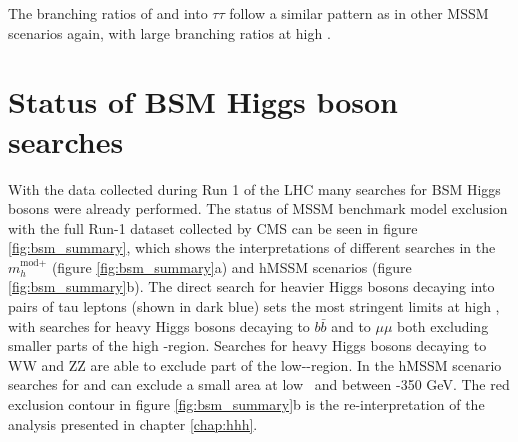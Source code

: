 The branching ratios of \PHiggs and \PHiggsps into $\tau\tau$ follow a similar
pattern as in other MSSM scenarios again, with large branching ratios at high \tanb.




\section{Status of BSM Higgs boson searches}
\label{sec:theory_BSMH_status}
With the data collected during 
Run 1 of the \ac{LHC} many searches for BSM Higgs
bosons were already performed. The status of MSSM benchmark model exclusion with the full
Run-1 dataset collected by \ac{CMS} can be seen in figure \ref{fig:bsm_summary},
which shows the interpretations of different searches in the $m_{h}^{\text{mod+}}$ (figure \ref{fig:bsm_summary}a)
and hMSSM scenarios (figure \ref{fig:bsm_summary}b). The direct search for heavier Higgs bosons decaying into pairs
of tau leptons (shown in dark blue) sets the most stringent limits at high \tanb, with searches for 
heavy Higgs bosons decaying to $b\bar{b}$ and to $\mu\mu$ both excluding smaller parts of the high \tanb-region.
Searches for heavy Higgs bosons decaying to WW and ZZ are able to exclude part of the low-\tanb-region. In the 
hMSSM scenario searches for \Htohh and \AtoZh can exclude a small area at low \tanb~and between -350 GeV.
The red exclusion contour in figure \ref{fig:bsm_summary}b is the re-interpretation of the analysis presented in
chapter \ref{chap:hhh}.

